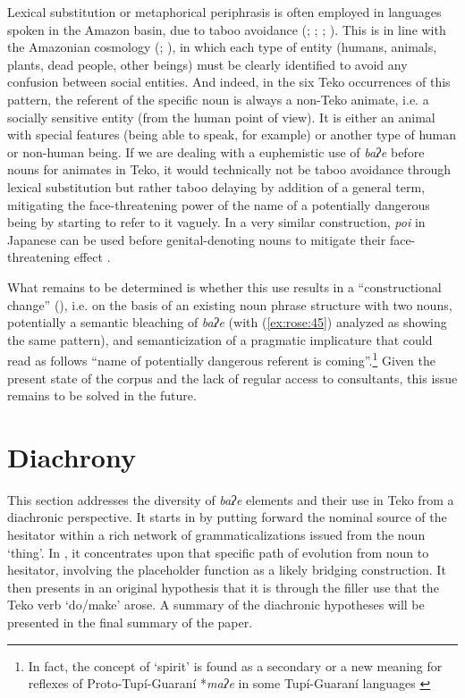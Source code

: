 \documentclass[output=paper]{langscibook}
\begin{document}
Lexical substitution or metaphorical periphrasis is often employed in languages spoken in the Amazon basin, due to taboo avoidance (\citealt{DienstDienst2009}; \citealt{Mihas2019}; \citealt{Wojtylak2015}; \citealt{Wojtylak2019}). This is in line with the Amazonian cosmology (\citealt{Castro1998}; \citealt{Santos-Granero2007}), in which each type of entity (humans, animals, plants, dead people, other beings) must be clearly identified to avoid any confusion between social entities. And indeed, in the six Teko occurrences of this pattern, the referent of the specific noun is always a non-Teko animate, i.e. a socially sensitive entity (from the human point of view). It is either an animal with special features (being able to speak, for example) or another type of human or non-human being. If we are dealing with a euphemistic use of \textit{baʔe} before nouns for animates in Teko, it would technically not be taboo avoidance through lexical substitution but rather taboo delaying by addition of a general term, mitigating the face-threatening power of the name of a potentially dangerous being by starting to refer to it vaguely. In a very similar construction, \textit{poi} in Japanese can be used before genital-denoting nouns to mitigate their face-threatening effect \citep[13]{Seraku2024}.

What remains to be determined is whether this use results in a “constructional change” (\citealt{TraugottTrousdale2013}), i.e. on the basis of an existing noun phrase structure with two nouns, potentially a semantic bleaching of \textit{baʔe} (with (\ref{ex:rose:45}) analyzed as showing the same pattern), and semanticization of a pragmatic implicature that could read as follows “name of potentially dangerous referent is coming”.\footnote{In fact, the concept of ‘spirit’ is found as a secondary or a new meaning for reflexes of Proto-Tupí-Guaraní *\textit{maʔe} in some Tupí-Guaraní languages \citep{chousouNodate}}  Given the present state of the corpus and the lack of regular access to consultants, this issue remains to be solved in the future.

\section{Diachrony}
\label{sec:rose:5}
This section addresses the diversity of \textit{baʔe} elements and their use in Teko from a diachronic perspective. It starts in  by putting forward the nominal source of the hesitator within a rich network of grammaticalizations issued from the noun ‘thing’. In , it concentrates upon that specific path of evolution from noun to hesitator, involving the placeholder function as a likely bridging construction. It then presents in  an original hypothesis that it is through the filler use that the Teko verb ‘do/make’ arose. A summary of the diachronic hypotheses will be presented in the final summary of the paper.
\end{document}
